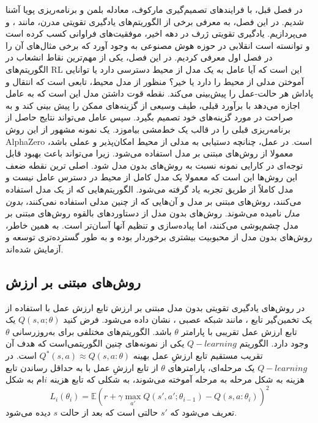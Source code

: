
در فصل قبل، با فرایند‌های تصمیم‌گیری مارکوف، معادله بلمن و برنامه‌ریزی پویا آشنا شدیم. در این فصل، به معرفی برخی از الگوریتم‌های یادگیری تقویتی مدرن، مانند
،
 و 
  می‌پردازیم. یادگیری تقویتی ژرف در دهه اخیر، موفقیت‌های فراوانی کسب کرده است و توانسته است انقلابی در حوزه هوش مصنوعی به وجود آورد که برخی مثال‌های آن را در فصل اول معرفی کردیم. در این فصل، 
یکی از مهم‌ترین نقاط انشعاب در الگوریتم‌‌های RL این است که آیا عامل به یک مدل از محیط دسترسی دارد یا  توانایی آموختن مدلی از محیط را دارد یا خیر؟ منظور از مدل محیط، تابعی است که انتقال و پاداش هر حالت-عمل را پیش‌بینی می‌کند.
نقطه قوت داشتن مدل این است که به عامل اجازه می‌دهد با برآورد قبلی، طیف وسیعی از گزینه‌های ممکن را پیش بینی کند و به صراحت در مورد گزینه‌های خود تصمیم بگیرد. سپس عامل می‌تواند نتایج حاصل از برنامه‌ریزی قبلی را در قالب یک خط‌مشی بیاموزد. یک نمونه مشهور از این روش 
AlphaZero است. در عمل، چنانچه دستیابی به مدلی از محیط امکان‌پذیر و عملی باشد، معمولا از روش‌های مبتنی بر مدل استفاده می‌شود. زیرا می‌تواند باعث بهبود قابل توجه‌ای در کارایی نمونه نسبت به روش‌های بدون مدل شود. اصلی ترین نقطه ضعف این روش‌ها این است که معمولا یک مدل کامل از محیط  در دسترس عامل نیست و مدل کاملاً از طریق تجربه یاد گرفته می‌شود. الگوریتم‌هایی که از یک مدل استفاده می‌کنند، روش‌های مبتنی بر مدل و آن‌هایی که از چنین مدلی استفاده نمی‌کنند، \textit{بدون مدل} نامیده می‌شوند. روش‌های بدون مدل از دستاوردهای بالقوه روش‌های مبتنی بر مدل چشم‌پوشی می‌کنند‌، اما پیاده‌سازی و تنظیم آنها آسان‌تر است. به همین خاطر، روش‌های بدون مدل از محبوبیت بیشتری برخوردار بوده و به طور گسترده‌تری توسعه و آزمایش شده‌اند.

\subsection{روش‌های مبتنی بر ارزش}


در روش‌های یادگیری تقویتی بدون مدل مبتنی بر ارزش
تابع ارزش عمل با استفاده از  یک تخمین‌گیر تابع
 ، مانند شبکه عصبی ، نشان داده می‌شود. فرض کنید
$Q(s,a;\theta)$
یک تابع ارزش عمل تقریبی با پارامتر  
$\theta$ 
باشد.
الگوریتم‌های مختلفی برای به‌روزرسانی $\theta$ وجود دارد.
الگوریتم $ Q-learning$ یکی از نمونه‌های چنین الگوریتمی‌است
که هدف آن تقریب مستقیم تابع ارزشِ عمل بهینه 
$Q^*(s,a) \approx Q(s,a: \theta)$
 است. در $ Q-learning$ یک مرحله‌ای، پارامترهای $\theta$ از تابع ارزشِ عمل با به حداقل رساندن تابع هزینه به شکل مرحله به مرحله آموخته می‌شوند، به شکلی که تابع هزینه $i$ام به شکل 
$$L_i(\theta_i) = \mathbb{E} {\left( r+\gamma \max_{a'} Q(s',a'; \theta_{i-1})- Q(s,a:\theta_i) \right)}^2$$
 تعریف می‌شود که 
 $s'$
 حالتی است که بعد از حالت $s$ دیده می‌شود.
